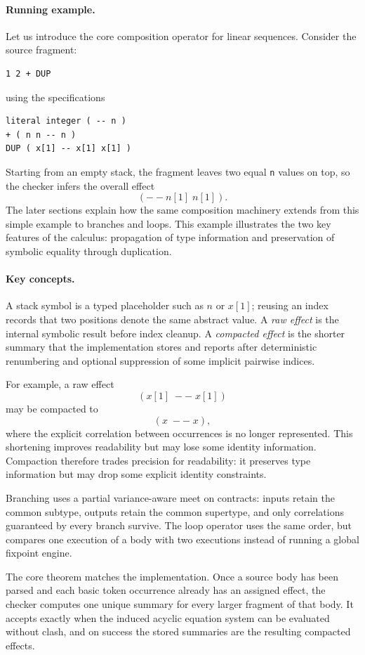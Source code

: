 \documentclass[acmsmall,screen,review,anonymous,nonacm]{acmart}
\begin{document}
\paragraph{Running example.}
Let us introduce the core composition
operator for linear sequences. Consider the source fragment:
\begin{lstlisting}
1 2 + DUP
\end{lstlisting}
using the specifications
\begin{lstlisting}
literal integer ( -- n )
+ ( n n -- n )
DUP ( x[1] -- x[1] x[1] )
\end{lstlisting}
Starting from an empty stack, the fragment leaves two equal \texttt{n} values on top, so
the checker infers the overall effect
\[
( -- n[1]\;n[1]).
\]
The later sections explain how the same composition machinery extends from this simple
example to branches and loops.
This example illustrates the two key features of the calculus: propagation of type
information and preservation of symbolic equality through duplication.

\paragraph{Key concepts.}
A stack symbol is a typed placeholder such as $n$ or $x[1]$; reusing an index records
that two positions denote the same abstract value. A \emph{raw effect} is the internal
symbolic result before index cleanup. A \emph{compacted effect} is the shorter summary
that the implementation stores and reports after deterministic renumbering and optional
suppression of some implicit pairwise indices.

For example, a raw effect
\[
(x[1] \;--\; x[1])
\]
may be compacted to
\[
(x \;--\; x),
\]
where the explicit correlation between occurrences is no longer represented. This
shortening improves readability but may lose some identity information.
Compaction therefore trades precision for readability: it preserves type information but
may drop some explicit identity constraints.

Branching uses a partial variance-aware meet on contracts: inputs retain the common
subtype, outputs retain the common supertype, and only correlations guaranteed by every
branch survive. The loop operator uses the same order, but compares one execution of a body
with two executions instead of running a global fixpoint engine.

The core theorem matches the implementation. Once a source body has been parsed and each
basic token occurrence already has an assigned effect, the checker computes one unique
summary for every larger fragment of that body. It accepts exactly when the induced
acyclic equation system can be evaluated without clash, and on success the stored
summaries are the resulting compacted effects.
\end{document}
